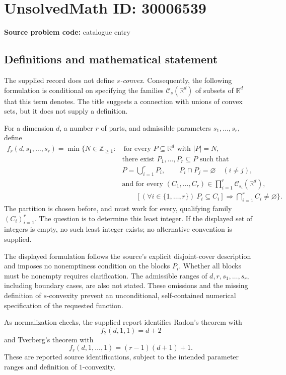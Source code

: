 \documentclass[11pt]{article}
\newcommand{\Z}{\mathbb{Z}}
\newcommand{\R}{\mathbb{R}}
\begin{document}
\section*{UnsolvedMath ID: 30006539}
\textbf{Source problem code:} catalogue entry
\subsection{Definitions and mathematical statement}
The supplied record does not define \emph{$s$-convex}. Consequently, the following formulation is conditional on specifying the families \(\mathcal C_s(\R^d)\) of subsets of \(\R^d\) that this term denotes. The title suggests a connection with unions of convex sets, but it does not supply a definition.

For a dimension \(d\), a number \(r\) of parts, and admissible parameters \(s_1,\ldots,s_r\), define
\[
\begin{aligned}
f_r(d,s_1,\ldots,s_r)=\min\bigl\{N\in\Z_{\geq1}:{}&\ \text{for every }P\subseteq\R^d\text{ with }|P|=N,\\
&\text{there exist }P_1,\ldots,P_r\subseteq P\text{ such that}\\
&P=\bigcup_{i=1}^r P_i,\qquad P_i\cap P_j=\varnothing\quad(i\ne j),\\
&\text{and for every }(C_1,\ldots,C_r)\in\prod_{i=1}^r\mathcal C_{s_i}(\R^d),\\
&\qquad\left[(\forall i\in\{1,\ldots,r\})\ P_i\subseteq C_i\right]
\Longrightarrow \bigcap_{i=1}^r C_i\ne\varnothing\bigr\}.
\end{aligned}
\]
The partition is chosen before, and must work for every, qualifying family \((C_i)_{i=1}^r\). The question is to determine this least integer. If the displayed set of integers is empty, no such least integer exists; no alternative convention is supplied.

The displayed formulation follows the source's explicit disjoint-cover description and imposes no nonemptiness condition on the blocks \(P_i\). Whether all blocks must be nonempty requires clarification. The admissible ranges of \(d,r,s_1,\ldots,s_r\), including boundary cases, are also not stated. These omissions and the missing definition of \(s\)-convexity prevent an unconditional, self-contained numerical specification of the requested function.

As normalization checks, the supplied report identifies Radon's theorem with
\[
f_2(d,1,1)=d+2
\]
and Tverberg's theorem with
\[
f_r(d,1,\ldots,1)=(r-1)(d+1)+1.
\]
These are reported source identifications, subject to the intended parameter ranges and definition of \(1\)-convexity.
\end{document}
